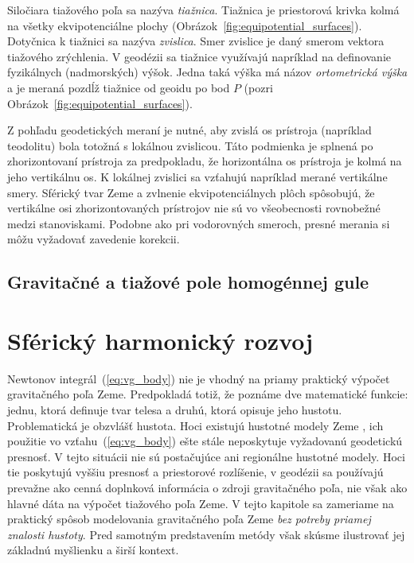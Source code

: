 \documentclass[a4paper, 12pt]{book}
\begin{document}
Siločiara tiažového poľa sa nazýva \emph{tiažnica}.  Tiažnica je priestorová 
krivka kolmá na všetky ekvipotenciálne plochy 
(Obrázok~\ref{fig:equipotential_surfaces}).  Dotyčnica k tiažnici sa nazýva 
\emph{zvislica}.  Smer zvislice je daný smerom vektora tiažového zrýchlenia.  
V geodézii sa tiažnice využívajú napríklad na definovanie fyzikálnych 
(nadmorských) výšok.  Jedna taká výška má názov \emph{ortometrická výška} a je 
meraná pozdĺž tiažnice od geoidu po bod $P$ (pozri 
Obrázok~\ref{fig:equipotential_surfaces}).

Z pohľadu geodetických meraní je nutné, aby zvislá os prístroja (napríklad 
teodolitu) bola totožná s lokálnou zvislicou.  Táto podmienka je splnená po 
zhorizontovaní prístroja za predpokladu, že horizontálna os prístroja je kolmá 
na jeho vertikálnu os.  K lokálnej zvislici sa vzťahujú napríklad merané 
vertikálne smery.  Sférický tvar Zeme a zvlnenie ekvipotenciálnych plôch 
spôsobujú, že vertikálne osi zhorizontovaných prístrojov nie sú vo všeobecnosti 
rovnobežné medzi stanoviskami.  Podobne ako pri vodorovných smeroch, presné 
merania si môžu vyžadovať zavedenie korekcii.






\section{Gravitačné a tiažové pole homogénnej gule}






\chapter{Sférický harmonický rozvoj}
\label{sec:spherical_harmonic_expansion}

Newtonov integrál~(\ref{eq:vg_body}) nie je vhodný na priamy praktický výpočet 
gravitačného poľa Zeme.  Predpokladá totiž, že poznáme dve matematické funkcie: 
jednu, ktorá definuje tvar telesa a druhú, ktorá opisuje jeho hustotu.  
Problematická je obzvlášť hustota.  Hoci existujú hustotné modely Zeme 
\citep[napríklad][]{Dziewonski1981}, ich použitie vo vzťahu~(\ref{eq:vg_body}) 
ešte stále neposkytuje vyžadovanú geodetickú presnosť.  V tejto situácii nie sú 
postačujúce ani regionálne hustotné modely.  Hoci tie poskytujú vyššiu presnosť 
a priestorové rozlíšenie, v geodézii sa používajú prevažne ako cenná doplnková 
informácia o zdroji gravitačného poľa, nie však ako hlavné dáta na výpočet 
tiažového poľa Zeme.  V tejto kapitole sa zameriame na praktický spôsob 
modelovania gravitačného poľa Zeme \emph{bez potreby priamej znalosti hustoty}.  
Pred samotným predstavením metódy však skúsme ilustrovať jej základnú myšlienku 
a širší kontext.
\end{document}
